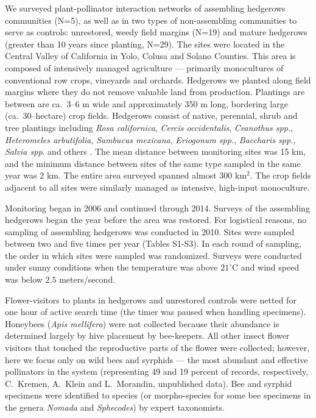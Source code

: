 \documentclass[12pt]{article}
\begin{document}
We surveyed plant-pollinator interaction networks of assembling
hedgerows communities (N=5), as well as in two types of non-assembling
communities to serve as controls: unrestored, weedy field margins
(N=19) and mature hedgerows (greater than 10 years since planting,
N=29). The sites were located in the Central Valley of California in
Yolo, Colusa and Solano Counties. This area is composed of intensively
managed agriculture --- primarily monocultures of conventional row
crops, vineyards and orchards. Hedgerows we planted along field
margins where they do not remove valuable land from
production. Plantings are between are ca.~3--6 m wide and
approximately 350 m long, bordering large (ca.\ 30--hectare) crop
fields. Hedgerows consist of native, perennial, shrub and tree
plantings including \textit{Rosa californica}, \textit{Cercis
  occidentalis}, \textit{Ceanothus spp.}, \textit{Heteromeles
  arbutifolia}, \textit{Sambucus mexicana}, \textit{Eriogonum spp.},
\textit{Baccharis spp.}, \textit{Salvia spp}. and others
\citep{kremen-2015-602, mgonigle-2015-x}. The mean distance between
monitoring sites was 15 km, and the minimum distance between sites of
the same type sampled in the same year was 2 km.  The entire area
surveyed spanned almost 300 km$^2$. The crop fields adjacent to all
sites were similarly managed as intensive, high-input monoculture.

Monitoring began in 2006 and continued through 2014. Surveys of the
assembling hedgerows began the year before the area was restored. For
logistical reasons, no sampling of assembling hedgerows was conducted
in 2010. Sites were sampled between two and five times per year
(Tables S1-S3). In each round of sampling, the order in which sites
were sampled was randomized. Surveys were conducted under sunny
conditions when the temperature was above $21^{\circ}\mathrm{C}$ and
wind speed was below $2.5$ meters/second.

Flower-visitors to plants in hedgerows and unrestored controls were
netted for one hour of active search time (the timer was paused when
handling specimens). Honeybees (\textit{Apis mellifera}) were not
collected because their abundance is determined largely by hive
placement by bee-keepers. All other insect flower visitors that
touched the reproductive parts of the flower were collected; however,
here we focus only on wild bees and syrphids --- the most abundant and
effective pollinators in the system (representing 49 and 19 percent of
records, respectively, C.~Kremen, A.~Klein and L.~Morandin,
unpublished data). Bee and syrphid specimens were identified to
species (or morpho-species for some bee specimens in the genera
\textit{Nomada} and \textit{Sphecodes}) by expert taxonomists.
\end{document}

